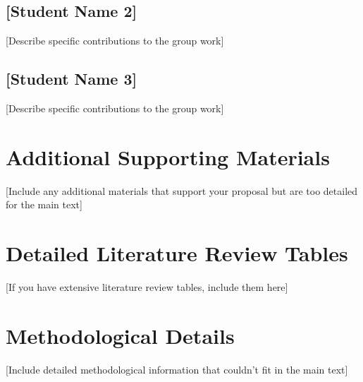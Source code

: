 \documentclass[12pt,a4paper]{article}
\begin{document}
\subsection*{[Student Name 2]}
[Describe specific contributions to the group work]

\subsection*{[Student Name 3]}
[Describe specific contributions to the group work]

\clearpage
{}
\printbibliography[heading=bibintoc]

\clearpage

\begin{appendices}
\section{Additional Supporting Materials}
[Include any additional materials that support your proposal but are too detailed for the main text]

\section{Detailed Literature Review Tables}
[If you have extensive literature review tables, include them here]

\section{Methodological Details}
[Include detailed methodological information that couldn't fit in the main text]

\end{appendices}
\end{document}
